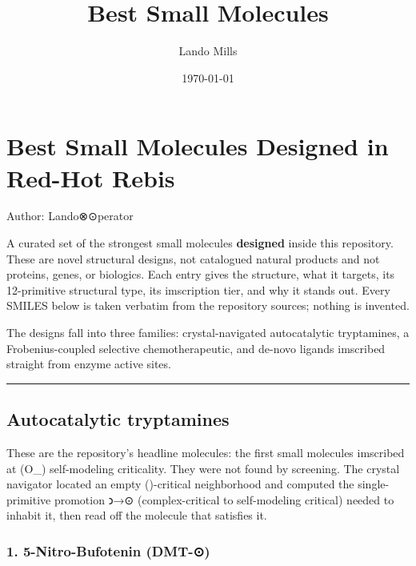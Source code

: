 \documentclass[12pt,a4paper]{article}
\title{Best Small Molecules}
\date{\today}
\author{Lando Mills}
\begin{document}
\maketitle
\hypertarget{best-small-molecules-designed-in-red-hot-rebis}{%
\section{Best Small Molecules Designed in Red-Hot
Rebis}\label{best-small-molecules-designed-in-red-hot-rebis}}

Author: Lando⊗⊙perator

A curated set of the strongest small molecules \textbf{designed} inside
this repository. These are novel structural designs, not catalogued
natural products and not proteins, genes, or biologics. Each entry gives
the structure, what it targets, its 12-primitive structural type, its
imscription tier, and why it stands out. Every SMILES below is taken
verbatim from the repository sources; nothing is invented.

The designs fall into three families: crystal-navigated autocatalytic
tryptamines, a Frobenius-coupled selective chemotherapeutic, and de-novo
ligands imscribed straight from enzyme active sites.

\begin{center}\rule{0.5\linewidth}{0.5pt}\end{center}

\hypertarget{autocatalytic-tryptamines}{%
\subsection{Autocatalytic tryptamines}\label{autocatalytic-tryptamines}}

These are the repository's headline molecules: the first small molecules
imscribed at (O\_\infty) self-modeling criticality. They were not found
by screening. The crystal navigator located an empty (\odot)-critical
neighborhood and computed the single-primitive promotion 𐑮→⊙
(complex-critical to self-modeling critical) needed to inhabit it, then
read off the molecule that satisfies it.

\hypertarget{nitro-bufotenin-dmt-}{%
\subsubsection{1. 5-Nitro-Bufotenin
(DMT-⊙)}\label{nitro-bufotenin-dmt-}}
\end{document}
